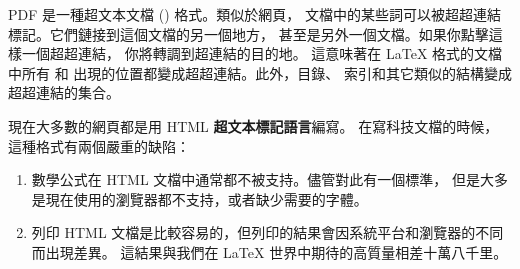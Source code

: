 
PDF 是一種超文本文檔 () 格式。類似於網頁，
文檔中的某些詞可以被超超連結標記。它們鏈接到這個文檔的另一個地方，
甚至是另外一個文檔。如果你點擊這樣一個超超連結，
你將轉調到超連結的目的地。
這意味著在 \LaTeX{} 格式的文檔中所有  和  出現的位置都變成超超連結。此外，目錄、
索引和其它類似的結構變成超超連結的集合。


現在大多數的網頁都是用 HTML \textbf{超文本標記語言}編寫。
在寫科技文檔的時候，這種格式有兩個嚴重的缺陷：
\begin{enumerate}
\item 數學公式在 HTML 文檔中通常都不被支持。儘管對此有一個標準，
但是大多是現在使用的瀏覽器都不支持，或者缺少需要的字體。
\item 列印 HTML 文檔是比較容易的，但列印的結果會因系統平台和瀏覽器的不同
而出現差異。
這結果與我們在 \LaTeX{} 世界中期待的高質量相差十萬八千里。
\end{enumerate}


